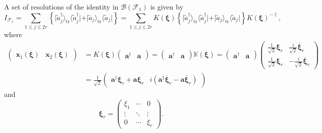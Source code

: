 \documentclass[aps, preprint]{revtex4}
\begin{document}
A set of resolutions of the identity in $\mathcal{B} \left (\mathcal{F}_{1}\right )$ is given by
\begin{equation}I_{\mathcal{F}_{1}} =\sum _{1 \leq j \leq 2 r}\left \{\vert \widetilde{a}_{j}^{ \dag } \rangle _{\ensuremath{\operatorname*{tr}}}  \langle \widetilde{a}_{j}^{ \dag }\vert  +\vert \widetilde{a}_{j} \rangle _{\ensuremath{\operatorname*{tr}}} \langle \widetilde{a}_{j}\vert \right \} =\sum _{1 \leq j \leq 2 r}K \left (\mathbf{\xi }\right ) \left \{\vert \widetilde{a}_{j}^{ \dag } \rangle _{\ensuremath{\operatorname*{tr}}}  \langle \widetilde{a}_{j}^{ \dag }\vert  +\vert \widetilde{a}_{j} \rangle _{\ensuremath{\operatorname*{tr}}} \langle \widetilde{a}_{j}\vert \right \} K \left (\mathbf{\xi }\right )^{ - \dag }\text{,}
\end{equation}where
\begin{align}\left (\begin{array}{cc}\mathbf{x}_{1} \left (\mathbf{\xi }\right ) & \mathbf{x}_{2} \left (\mathbf{\xi }\right )\end{array}\right ) &  =K \left (\mathbf{\xi }\right ) \left (\begin{array}{cc}\mathbf{a}^{ \dag } & \mathbf{a}\end{array}\right ) =\left (\begin{array}{cc}\mathbf{a}^{ \dag } & \mathbf{a}\end{array}\right ) \mathbb{K} \left (\mathbf{\xi }\right ) =\left (\begin{array}{cc}\mathbf{a}^{ \dag } & \mathbf{a}\end{array}\right ) \left (\begin{array}{cc}\frac{1}{\sqrt{2}} \mathbf{\xi }_{r} & \frac{i}{\sqrt{2}} \overline{\mathbf{\xi }}_{r} \\
\frac{1}{\sqrt{2}} \mathbf{\xi }_{r} &  -\frac{i}{\sqrt{2}} \overline{\mathbf{\xi }}_{r}\end{array}\right ) \\
 &  =\frac{1}{\sqrt{2}} \left (\begin{array}{cc}\mathbf{a}^{ \dag } \mathbf{\xi }_{r} +\mathbf{a} \mathbf{\xi }_{r} & i \left (\mathbf{a}^{ \dag } \overline{\mathbf{\xi }}_{r} -\mathbf{a} \overline{\mathbf{\xi }}_{r}\right )\end{array}\right )\end{align}and
\begin{equation}\mathbf{\xi }_{r} =\left (\begin{array}{ccc}\xi _{1} & \cdots  & 0 \\
\vdots  & \ddots  & \vdots  \\
0 & \cdots  & \xi _{r}\end{array}\right )\text{.}
\end{equation}
\end{document}
